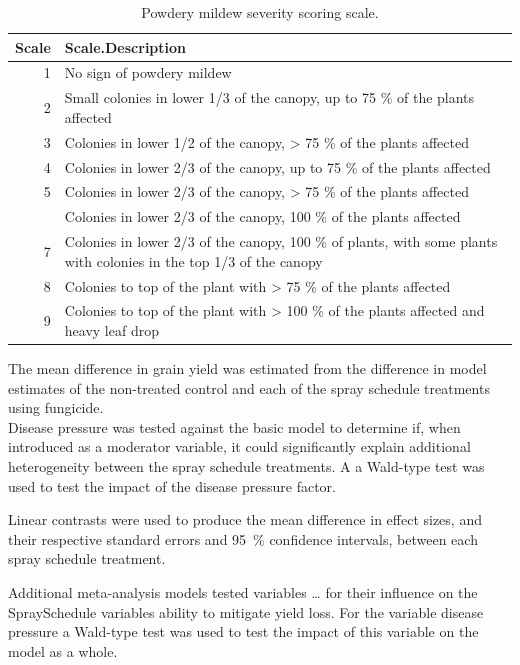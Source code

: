 \documentclass[agronomy,article,submit,moreauthors,pdftex]{mdpi}
\begin{document}
\begin{table}

\caption{\label{tab:Table2}Powdery mildew severity scoring scale.}
\centering
\begin{tabular}[t]{rl}
\toprule
Scale & Scale.Description\\
\midrule
1 & No sign of powdery mildew\\
2 & Small colonies in lower 1/3 of the canopy, up to 75 \% of the plants affected\\
3 & Colonies in lower 1/2 of the canopy, > 75 \% of the plants affected\\
4 & Colonies in lower 2/3 of the canopy, up to 75 \% of the plants affected\\
5 & Colonies in lower 2/3 of the canopy, > 75 \% of the plants affected\\
\addlinespace
6 & Colonies in lower 2/3 of the canopy, 100 \% of the plants affected\\
7 & Colonies in lower 2/3 of the canopy, 100 \% of plants, with some plants with colonies in the top 1/3 of the canopy\\
8 & Colonies to top of the plant with > 75 \% of the plants affected\\
9 & Colonies to top of the plant with > 100 \% of the plants affected and heavy leaf drop\\
\bottomrule
\end{tabular}
\end{table}

The mean difference in grain yield was estimated from the difference in model estimates of the non-treated control and each of the spray schedule treatments using fungicide.\\
Disease pressure was tested against the basic model to determine if, when introduced as a moderator variable, it could significantly explain additional heterogeneity between the spray schedule treatments.
A a Wald-type test was used to test the impact of the disease pressure factor.

Linear contrasts were used to produce the mean difference in effect sizes, and their respective standard errors and 95~\% confidence intervals, between each spray schedule treatment.

Additional meta-analysis models tested variables \ldots{} for their influence on the SpraySchedule variables ability to mitigate yield loss.
For the variable disease pressure a Wald-type test was used to test the impact of this variable on the model as a whole.
\end{document}
